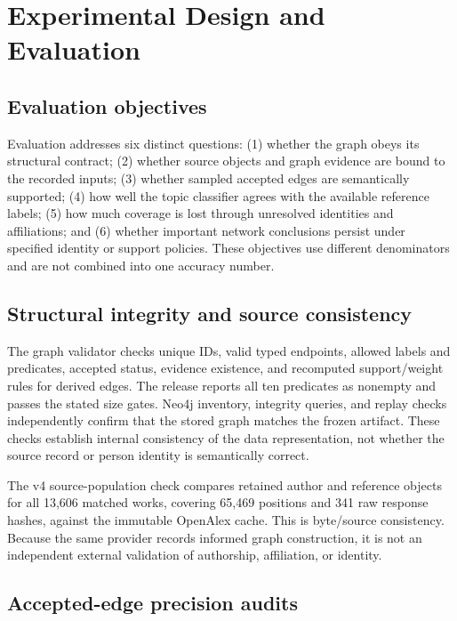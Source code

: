 \chapter{Experimental Design and Evaluation}
\label{chap:evaluation}

\section{Evaluation objectives}

Evaluation addresses six distinct questions: (1) whether the graph obeys its
structural contract; (2) whether source objects and graph evidence are bound to
the recorded inputs; (3) whether sampled accepted edges are semantically
supported; (4) how well the topic classifier agrees with the available reference
labels; (5) how much coverage is lost through unresolved identities and
affiliations; and (6) whether important network conclusions persist under
specified identity or support policies. These objectives use different
denominators and are not combined into one accuracy number.

\section{Structural integrity and source consistency}

The graph validator checks unique IDs, valid typed endpoints, allowed labels and
predicates, accepted status, evidence existence, and recomputed support/weight
rules for derived edges. The release reports all ten predicates as nonempty and
passes the stated size gates. Neo4j inventory, integrity queries, and replay
checks independently confirm that the stored graph matches the frozen artifact.
These checks establish internal consistency of the data representation, not
whether the source record or person identity is semantically correct.

The v4 source-population check compares retained author and reference objects
for all 13,606 matched works, covering 65,469 positions and 341 raw response
hashes, against the immutable OpenAlex cache. This is byte/source consistency.
Because the same provider records informed graph construction, it is not an
independent external validation of authorship, affiliation, or identity.

\section{Accepted-edge precision audits}

